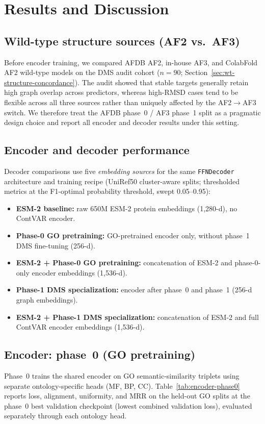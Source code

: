 \documentclass[11pt,a4paper]{article}
\begin{document}
\section{Results and Discussion}

\subsection{Wild-type structure sources (AF2 vs.\ AF3)}
Before encoder training, we compared AFDB AF2, in-house AF3, and ColabFold AF2 wild-type models on the DMS audit cohort ($n{=}90$; Section~\ref{sec:wt-structure-concordance}). The audit showed that stable targets generally retain high graph overlap across predictors, whereas high-RMSD cases tend to be flexible across all three sources rather than uniquely affected by the AF2$\rightarrow$AF3 switch. We therefore treat the AFDB phase~0 / AF3 phase~1 split as a pragmatic design choice and report all encoder and decoder results under this setting.

\subsection{Encoder and decoder performance}
Decoder comparisons use five \emph{embedding sources} for the same \texttt{FFNDecoder} architecture and training recipe (UniRef50 cluster-aware splits; thresholded metrics at the F1-optimal probability threshold, swept 0.05--0.95):
\begin{itemize}
    \item \textbf{ESM-2 baseline:} raw 650M ESM-2 protein embeddings (1{,}280-d), no ContVAR encoder.
    \item \textbf{Phase-0 GO pretraining:} GO-pretrained encoder only, without phase~1 DMS fine-tuning (256-d).
    \item \textbf{ESM-2 + Phase-0 GO pretraining:} concatenation of ESM-2 and phase-0-only encoder embeddings (1{,}536-d).
    \item \textbf{Phase-1 DMS specialization:} encoder after phase~0 and phase~1 (256-d graph embeddings).
    \item \textbf{ESM-2 + Phase-1 DMS specialization:} concatenation of ESM-2 and full ContVAR encoder embeddings (1{,}536-d).
\end{itemize}

\subsection{Encoder: phase~0 (GO pretraining)}
Phase~0 trains the shared encoder on GO semantic-similarity triplets using separate ontology-specific heads (MF, BP, CC). Table~\ref{tab:encoder-phase0} reports loss, alignment, uniformity, and MRR on the held-out GO splits at the phase~0 best validation checkpoint (lowest combined validation loss), evaluated separately through each ontology head.
\end{document}
